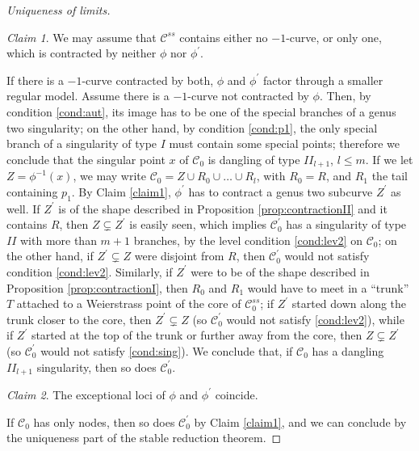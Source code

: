 \documentclass{compositio}
\theoremstyle{plain}
\theoremstyle{definition}
\theoremstyle{remark}
\newtheorem{claim}{Claim}
\begin{document}
\begin{proof}[Uniqueness of limits]
 \begin{claim}\label{claim2} We may assume that $\mathcal C^{ss}$ contains either no $-1$-curve, or only one, which is contracted by neither $\phi$ nor $\phi^\prime$.\end{claim}
 
 If there is a $-1$-curve contracted by both, $\phi$ and $\phi^\prime$ factor through a smaller regular model. Assume there is a $-1$-curve not contracted by $\phi$. Then, by condition \eqref{cond:aut}, its image has to be one of the special branches of a genus two singularity; on the other hand, by condition \eqref{cond:p1}, the only special branch of a singularity of type $I$ must contain some special points; therefore we conclude that the singular point $x$ of $\mathcal C_0$ is dangling of type $I\!I_{l+1}$, $l\leq m$. If we let $Z=\phi^{-1}(x)$, we may write $\mathcal C_0=Z\cup R_0\cup\ldots\cup R_l$, with $R_0=R$, and $R_1$ the tail containing $p_1$. 
 By Claim \ref{claim1}, $\phi^\prime$ has to contract a genus two subcurve $Z^\prime$ as well. If $Z^\prime$ is of the shape described in Proposition \ref{prop:contractionII} and it contains $R$, then $Z\subsetneq Z^\prime$ is easily seen, which implies $\mathcal C^\prime_0$ has a singularity of type $I\!I$ with more than $m+1$ branches, by the level condition \eqref{cond:lev2} on $\mathcal C_0$; on the other hand, if $Z^\prime\subsetneq Z$ were disjoint from $R$, then $\mathcal C^\prime_0$ would not satisfy condition \eqref{cond:lev2}. Similarly, if $Z^\prime$ were to be of the shape described in Proposition \ref{prop:contractionI}, then $R_0$ and $R_1$ would have to meet in a ``trunk'' $T$ attached to a Weierstrass point of the core of $\mathcal C_0^{ss}$; if $Z^\prime$ started down along the trunk closer to the core, then $Z^\prime\subsetneq Z$ (so $\mathcal C^\prime_0$ would not satisfy \eqref{cond:lev2}), while if $Z^\prime$ started at the top of the trunk or further away from the core, then $Z\subsetneq Z^\prime$ (so $\mathcal C^\prime_0$ would not satisfy \eqref{cond:sing}). We conclude that, if $\mathcal C_0$ has a dangling $I\!I_{l+1}$ singularity, then so does $\mathcal C^\prime_0$.
 
 \begin{claim} The exceptional loci of $\phi$ and $\phi^\prime$ coincide. \end{claim}
 
 If $\mathcal C_0$ has only nodes, then so does $\mathcal C^\prime_0$ by Claim \ref{claim1}, and we can conclude by the uniqueness part of the stable reduction theorem.
 

\end{proof}
\end{document}
